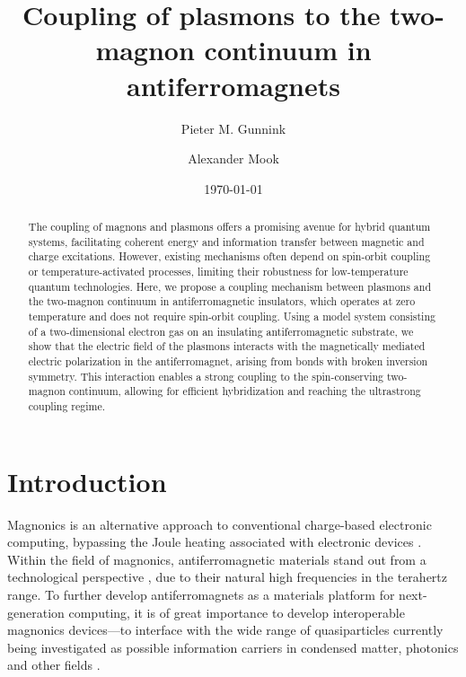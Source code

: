 \documentclass[aps,prb,reprint,twocolumns,superscriptaddress,nofootinbib]{revtex4-2}
\begin{document}
	\title{Coupling of plasmons to the two-magnon continuum in antiferromagnets}
	\date{\today}
	
	\author{Pieter M. Gunnink}
	\author{Alexander Mook}
	\begin{abstract}   
		The coupling of magnons and plasmons offers a promising avenue for hybrid quantum systems, facilitating coherent energy and information transfer between magnetic and charge excitations. However, existing mechanisms often depend on spin-orbit coupling or temperature-activated processes, limiting their robustness for low-temperature quantum technologies. Here, we propose a coupling mechanism between plasmons and the two-magnon continuum in antiferromagnetic insulators, which operates at zero temperature and does not require spin-orbit coupling. Using a model system consisting of a two-dimensional electron gas on an insulating antiferromagnetic substrate, we show that the electric field of the plasmons interacts with the magnetically mediated electric polarization in the antiferromagnet, arising from bonds with broken inversion symmetry. This interaction enables a strong coupling to the spin-conserving two-magnon continuum, allowing for efficient hybridization and reaching the ultrastrong coupling regime.
	\end{abstract}
	
	\maketitle
	
	
	
	\section{Introduction}
	
	Magnonics is an alternative approach to conventional charge-based electronic computing, bypassing the Joule heating associated with electronic devices \cite{flebus2024MagnonicsRoadmap2024}. Within the field of magnonics, antiferromagnetic materials stand out from a technological perspective \cite{baltzAntiferromagneticSpintronics2018}, due to their natural high frequencies in the terahertz range. To further develop antiferromagnets as a materials platform for next-generation computing, it is of great importance to develop interoperable magnonics devices---to interface with the wide range of quasiparticles currently being investigated as possible information carriers in condensed matter, photonics and other fields \cite{zarerameshtiCavityMagnonics2022,yuanQuantumMagnonicsWhen2022,chumakMagnonSpintronics2015}. 
	
\end{document}
